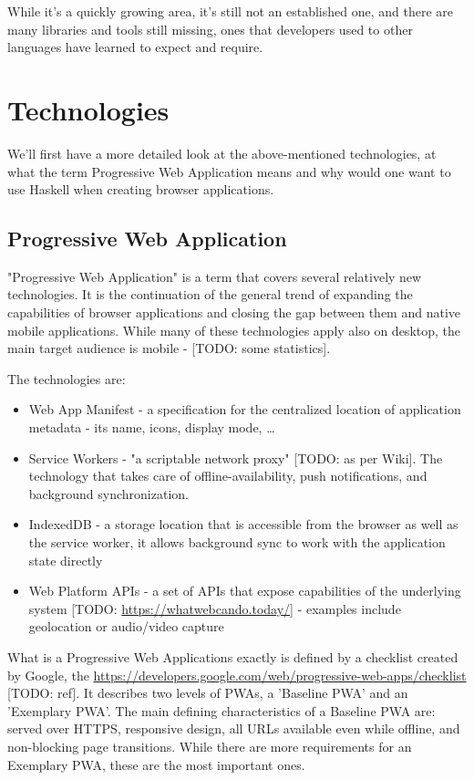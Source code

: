 \documentclass[english,odsaz]{fitthesis}
\begin{document}
While it's a quickly growing area, it's still not an established one, and there
are many libraries and tools still missing, ones that developers used to other
languages have learned to expect and require.

\chapter{Technologies}
\label{sec:orgc5f9f13}
We'll first have a more detailed look at the above-mentioned technologies, at
what the term Progressive Web Application means and why would one want to use
Haskell when creating browser applications.

\section{Progressive Web Application}
\label{sec:org6de7991}
"Progressive Web Application" is a term that covers several relatively new
technologies. It is the continuation of the general trend of expanding the
capabilities of browser applications and closing the gap between them and native
mobile applications. While many of these technologies apply also on desktop, the
main target audience is mobile - [TODO: some statistics].

The technologies are:
\begin{itemize}
\item Web App Manifest - a specification for the centralized location of application
metadata - its name, icons, display mode, \ldots{}
\item Service Workers - "a scriptable network proxy" [TODO: as per Wiki]. The
technology that takes care of offline-availability, push notifications, and
background synchronization.
\item IndexedDB - a storage location that is accessible from the browser as well as
the service worker, it allows background sync to work with the application
state directly
\item Web Platform APIs - a set of APIs that expose capabilities of the underlying
system [TODO: \url{https://whatwebcando.today/}] - examples include geolocation or
audio/video capture
\end{itemize}

What is a Progressive Web Applications exactly is defined by a checklist created
by Google, the \url{https://developers.google.com/web/progressive-web-apps/checklist}
[TODO: ref]. It describes two levels of PWAs, a 'Baseline PWA' and an 'Exemplary
PWA'. The main defining characteristics of a Baseline PWA are: served over
HTTPS, responsive design, all URLs available even while offline, and
non-blocking page transitions. While there are more requirements for an
Exemplary PWA, these are the most important ones.
\end{document}
